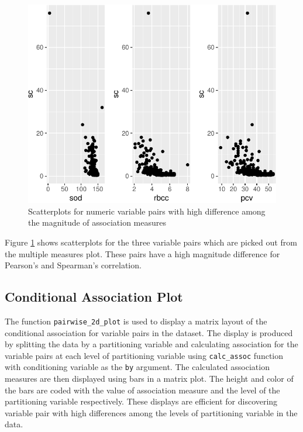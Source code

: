 \begin{Schunk}
\begin{figure}

{\centering \includegraphics{rj_paper_files/figure-latex/comp-var-pairs-1} 

}

\caption[Scatterplots for numeric variable pairs with high difference among the magnitude of association measures]{Scatterplots for numeric variable pairs with high difference among the magnitude of association measures}\label{fig:comp-var-pairs}
\end{figure}
\end{Schunk}

Figure \ref{fig:comp-var-pairs} shows scatterplots for the three
variable pairs which are picked out from the multiple measures plot.
These pairs have a high magnitude difference for Pearson's and
Spearman's correlation.

\hypertarget{conditional-association-plot}{%
\subsection{Conditional Association
Plot}\label{conditional-association-plot}}

The function \texttt{pairwise\_2d\_plot} is used to display a matrix
layout of the conditional association for variable pairs in the dataset.
The display is produced by splitting the data by a partitioning variable
and calculating association for the variable pairs at each level of
partitioning variable using \texttt{calc\_assoc} function with
conditioning variable as the \texttt{by} argument. The calculated
association measures are then displayed using bars in a matrix plot. The
height and color of the bars are coded with the value of association
measure and the level of the partitioning variable respectively. These
displays are efficient for discovering variable pair with high
differences among the levels of partitioning variable in the data.

